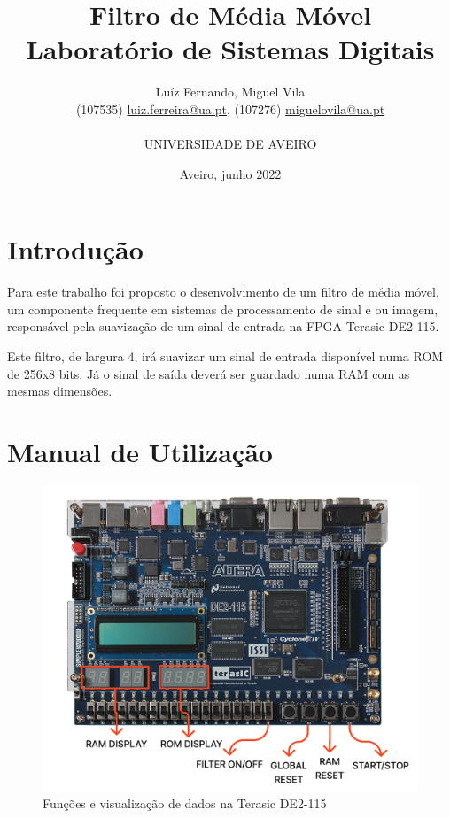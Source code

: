 \documentclass{report}
\begin{document}
\def\titulo{Filtro de Média Móvel}
\def\data{Aveiro, junho 2022}
\def\autores{Luíz Fernando, Miguel Vila}
\def\autorescontactos{(107535) \href{mailto:luiz.ferreira@ua.pt}{luiz.ferreira@ua.pt}, (107276) \href{mailto:miguelovila@ua.pt}{miguelovila@ua.pt}}
\def\disciplina{Laboratório de Sistemas Digitais}
\def\instituicao{UNIVERSIDADE DE AVEIRO}

\title{%
{\Huge\textbf{\titulo}}\\
{\Large \disciplina\\}
}
\author{
    \autores \\
    \autorescontactos \\\\
    \instituicao
}
\date{\data}
\maketitle
{}

\section*{Introdução}
\label{chap.introducao}

Para este trabalho foi proposto o desenvolvimento de um filtro de média móvel, um componente frequente em sistemas de processamento de sinal e ou imagem, responsável pela suavização de um sinal de entrada na FPGA Terasic DE2-115.

Este filtro, de largura 4, irá suavizar um sinal de entrada disponível numa ROM de 256x8 bits. Já o sinal de saída deverá ser guardado numa RAM com as mesmas dimensões.

\section*{Manual de Utilização}
\label{chap.manualdeutilizacao}

\begin{figure}[H]
    \centering
    \includegraphics[width=\textwidth]{fpga.jpg}
    \caption{Funções e visualização de dados na Terasic DE2-115}
\end{figure}
\end{document}
